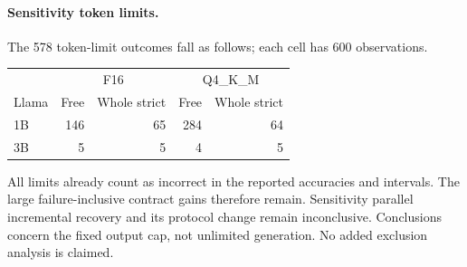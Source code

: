 \paragraph{Sensitivity token limits.} The 578 token-limit outcomes fall as follows; each cell has 600 observations.
\begin{center}\footnotesize
\begin{tabular}{lrrrr}\toprule
 & \multicolumn{2}{c}{F16} & \multicolumn{2}{c}{Q4\_K\_M} \\
Llama & Free & Whole strict & Free & Whole strict \\\midrule
1B & 146 & 65 & 284 & 64 \\
3B & 5 & 5 & 4 & 5 \\
\bottomrule\end{tabular}\end{center}
All limits already count as incorrect in the reported accuracies and intervals. The large failure-inclusive contract gains therefore remain. Sensitivity parallel incremental recovery and its protocol change remain inconclusive. Conclusions concern the fixed output cap, not unlimited generation. No added exclusion analysis is claimed.
